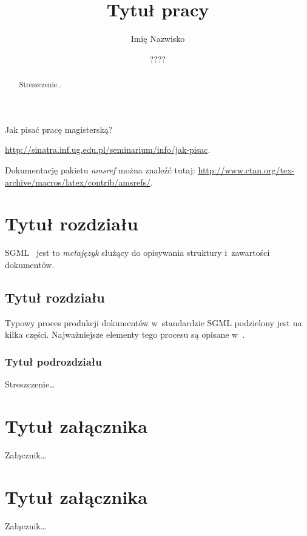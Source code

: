 \documentclass[brudnopis]{xmgr}
\author   {Imię Nazwisko}
\title    {Tytuł pracy}
\date     {????}
\begin{document}
\begin{abstract}
  Streszczenie…
\end{abstract}

\maketitle

\introduction

Jak pisać pracę magisterską?

\url{http://sinatra.inf.ug.edu.pl/seminarium/info/jak-pisac}.

Dokumentację pakietu \emph{amsref} można znaleźć tutaj:
\url{http://www.ctan.org/tex-archive/macros/latex/contrib/amsrefs/}.

\chapter{Tytuł rozdziału}

SGML~\cite{Goldfarb2002} jest to \emph{metajęzyk} 
służący do opisywania struktury i~zawartości dokumentów.
    
\section{Tytuł rozdziału}

Typowy proces produkcji dokumentów w~standardzie SGML
podzielony jest na kilka części. Najważniejsze elementy tego
procesu są opisane w~\cite{Eisenberg2002}.

\subsection{Tytuł podrozdziału}

\summary

Streszczenie…

\appendix
\chapter{Tytuł załącznika}

Załącznik…

\chapter{Tytuł załącznika}

Załącznik…

\begin{bibdiv}
\begin{biblist}


\end{biblist}
\end{bibdiv}



\oswiadczenie
\end{document}
